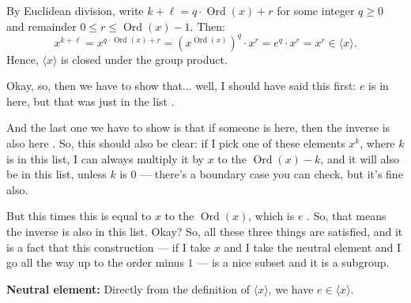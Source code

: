 \begin{proofWrapper}
\begin{content}
\begin{steps}
By Euclidean division, write $k + \ell = q \cdot \operatorname{Ord}(x) + r$ for some integer $q \ge 0$ and remainder $0 \le r \le \operatorname{Ord}(x) - 1$. Then:
\[
x^{k+\ell} = x^{q \cdot \operatorname{Ord}(x) + r} = \left(x^{\operatorname{Ord}(x)}\right)^q \cdot x^r = e^q \cdot x^r = x^r \in \langle x \rangle.
\]
Hence, $\langle x \rangle$ is closed under the group product.
\end{steps}
\end{content}

\begin{speech}[00:05:34 - 00:06:34]
Okay, so, then we have to show that... well, I should have said this first: $e$ is in here, but that was just in the list .

And the last one we have to show is that if someone is here, then the inverse is also here . So, this should also be clear: if I pick one of these elements $x^k$, where $k$ is in this list, I can always multiply it by $x$ to the $\operatorname{Ord}(x) - k$, and it will also be in this list, unless $k$ is $0$  --- there's a boundary case you can check, but it's fine also.

But this times this is equal to $x$ to the $\operatorname{Ord}(x)$, which is $e$ . So, that means the inverse is also in this list. Okay? So, all these three things are satisfied, and it is a fact that this construction --- if I take $x$ and I take the neutral element and I go all the way up to the order minus $1$ --- is a nice subset and it is a subgroup.
\end{speech}

\begin{content}
\textbf{Neutral element:} Directly from the definition of $\langle x \rangle$, we have $e \in \langle x \rangle$.


\end{content}
\end{proofWrapper}
